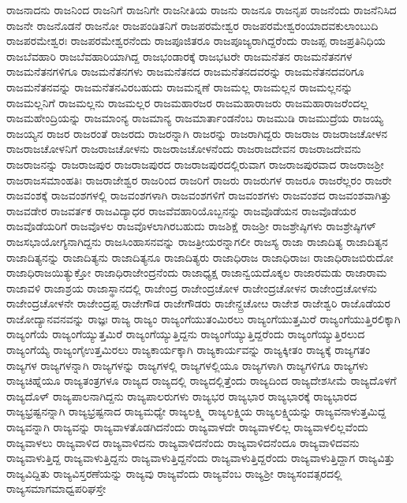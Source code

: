 {ರಾಜನಾದನು
ರಾಜನಿಂದ
ರಾಜನಿಗೆ
ರಾಜನಿಗೇ
ರಾಜನೀತಿಯ
ರಾಜನು
ರಾಜನೂ
ರಾಜನೃಪ
ರಾಜನೆಂದು
ರಾಜನೆನಿಸಿದ
ರಾಜನೇ
ರಾಜನೊಡನೆ
ರಾಜನೋ
ರಾಜಪಂಡಿತನಿಗೆ
ರಾಜಪರಮೇಶ್ವರ
ರಾಜಪರಮೇಶ್ವರಂಯಾದವಕುಲಾಂಬುದಿ
ರಾಜಪರಮೇಶ್ವರಃ
ರಾಜಪರಮೇಶ್ವರನೆಂದು
ರಾಜಪೂಜಿತರೂ
ರಾಜಪೂಜ್ಯರಾಗಿದ್ದರೆಂದು
ರಾಜಪ್ಪ
ರಾಜಪ್ರತಿನಿಧಿಯ
ರಾಜಬೆವಹಾರಿ
ರಾಜಬೆವಹಾರಿಯಾಗಿದ್ದ
ರಾಜಭಂಡಾರಕ್ಕೆ
ರಾಜಭಟರೇ
ರಾಜಮನೆತನ
ರಾಜಮನೆತನಗಳ
ರಾಜಮನೆತನಗಳಿಗೂ
ರಾಜಮನೆತನಗಳು
ರಾಜಮನೆತನದ
ರಾಜಮನೆತನದವರನ್ನು
ರಾಜಮನೆತನದವರಿಗೂ
ರಾಜಮನೆತನವನ್ನು
ರಾಜಮನೆತನವಿರಬಹುದು
ರಾಜಮನ್ನಣೆ
ರಾಜಮಲ್ಲ
ರಾಜಮಲ್ಲನ
ರಾಜಮಲ್ಲನನ್ನು
ರಾಜಮಲ್ಲನಿಗೆ
ರಾಜಮಲ್ಲನು
ರಾಜಮಲ್ಲರ
ರಾಜಮಹಾರಜರ
ರಾಜಮಹಾರಾಜರು
ರಾಜಮಹಾರಾಜರೆಂದಲ್ಲ
ರಾಜಮಹೇಂದ್ರಿಯನ್ನು
ರಾಜಮಾಂನ್ಯ
ರಾಜಮಾನ್ಯ
ರಾಜಮಾರ್ತಾಂಡನೆಂಬ
ರಾಜಮುಡಿ
ರಾಜಮುದ್ರೆಯ
ರಾಜಯ್ಯ
ರಾಜಯ್ಯನ
ರಾಜರ
ರಾಜರಂತೆ
ರಾಜರದು
ರಾಜರನ್ನಾಗಿ
ರಾಜರನ್ನು
ರಾಜರಾಗಿದ್ದರು
ರಾಜರಾಜ
ರಾಜರಾಜಚೋಳನ
ರಾಜರಾಜಚೋಳನಿಗೆ
ರಾಜರಾಜಚೋಳನು
ರಾಜರಾಜಚೋಳನೆಂದು
ರಾಜರಾಜದೇವನ
ರಾಜರಾಜದೇವನು
ರಾಜರಾಜನನ್ನು
ರಾಜರಾಜಪುರ
ರಾಜರಾಜಪುರದ
ರಾಜರಾಜಪುರದಲ್ಲಿರುವಾಗ
ರಾಜರಾಜಪುರವಾದ
ರಾಜರಾಜಶ್ರೀ
ರಾಜರಾಜಸಮಾಂಹತಿಃ
ರಾಜರಾಜೇಶ್ವರ
ರಾಜರಿಂದ
ರಾಜರಿಗೆ
ರಾಜರು
ರಾಜರುಗಳ
ರಾಜರೂ
ರಾಜರೆಲ್ಲರಂ
ರಾಜರೇ
ರಾಜವಂಶಕ್ಕೆ
ರಾಜವಂಶಗಳಲ್ಲಿ
ರಾಜವಂಶಗಳಾಗಿ
ರಾಜವಂಶಗಳಿಗೆ
ರಾಜವಂಶಗಳು
ರಾಜವಂಶದ
ರಾಜವಂಶವಾಗಿತ್ತು
ರಾಜವಡೇರ
ರಾಜವರ್ತಕ
ರಾಜವಿದ್ಯಾಧರ
ರಾಜವೆವಹಾರಿಯೊಬ್ಬನನ್ನು
ರಾಜವೊಡೆಯನ
ರಾಜವೊಡೆಯರ
ರಾಜವೊಡೆಯರಿಗೆ
ರಾಜವೊಳಲ
ರಾಜವೊಳಲಾಗಿರಬಹುದು
ರಾಜಶಿಕ್ಷೆ
ರಾಜಶ್ರೀ
ರಾಜಶ್ರೇಷ್ಠಿಗಳು
ರಾಜಶ್ರೇಷ್ಠಿಗಳ್
ರಾಜಸಭಾಯೋಗ್ಯನಾಗಿದ್ದನು
ರಾಜಸಿಂಹಾಸನವನ್ನು
ರಾಜತ್ರೀಯರನ್ನಾಗಲೀ
ರಾಜಸ್ಯ
ರಾಜಾ
ರಾಜಾದಿತ್ಯ
ರಾಜಾದಿತ್ಯನ
ರಾಜಾದಿತ್ಯನನ್ನು
ರಾಜಾದಿತ್ಯನು
ರಾಜಾದಿತ್ಯನೂ
ರಾಜಾದಿತ್ಯರು
ರಾಜಾಧಿರಾಜ
ರಾಜಾಧಿರಾಜಃ
ರಾಜಾಧಿರಾಜಬಿರುದೋ
ರಾಜಾಧಿರಾಜಯಿತ್ಯುಕ್ತೋ
ರಾಜಾಧಿರಾಜೇಂದ್ರನೆಂದು
ರಾಜಾಧ್ಯಕ್ಷ
ರಾಜಾನ್ವಯದೊಕ್ಕಲ
ರಾಜಾರಮಡು
ರಾಜಾರಾಮ
ರಾಜಾವಳಿ
ರಾಜಾಶ್ರಯ
ರಾಜಾಸ್ಥಾನದಲ್ಲಿ
ರಾಜೇಂದ್ರ
ರಾಜೇಂದ್ರಚೋಳ
ರಾಜೇಂದ್ರಚೋಳನ
ರಾಜೇಂದ್ರಚೋಳನು
ರಾಜೇಂದ್ರಚೋಳನೇ
ರಾಜೇಂದ್ರಪ್ಪ
ರಾಜೇಗೌಡ
ರಾಜೇಗೌಡರು
ರಾಜೇನ್ದ್ರಚೋೞ
ರಾಜೇಶ
ರಾಜೇಶ್ವರಿ
ರಾಜೊಡೆಯರ
ರಾಜೋದ್ಯಾನವನವನ್ನು
ರಾಜ್ಞಃ
ರಾಜ್ಯ
ರಾಜ್ಯಂ
ರಾಜ್ಯಂಗೆಯುತಂಮಿರಲು
ರಾಜ್ಯಂಗೆಯುತ್ತಮಿರೆ
ರಾಜ್ಯಂಗೆಯುತ್ತಿರಲಿಕ್ಕಾಗಿ
ರಾಜ್ಯಂಗೆಯೆ
ರಾಜ್ಯಂಗೆಯ್ಯುತ್ತಮಿರೆ
ರಾಜ್ಯಂಗೆಯ್ಯುತ್ತಿದ್ದನು
ರಾಜ್ಯಂಗೆಯ್ಯುತ್ತಿದ್ದರೆಂದು
ರಾಜ್ಯಂಗೆಯ್ಯುತ್ತಿರಲುದ
ರಾಜ್ಯಂಗೆಯ್ಯೆ
ರಾಜ್ಯಂಗೈಉತ್ತಮಿರಲು
ರಾಜ್ಯಕಾರ್ಯಕ್ಕಾಗಿ
ರಾಜ್ಯಕಾರ್ಯವನ್ನು
ರಾಜ್ಯಕ್ಕೀತಂ
ರಾಜ್ಯಕ್ಕೆ
ರಾಜ್ಯಗತಂ
ರಾಜ್ಯಗಳ
ರಾಜ್ಯಗಳನ್ನಾಗಿ
ರಾಜ್ಯಗಳನ್ನು
ರಾಜ್ಯಗಳಲ್ಲಿ
ರಾಜ್ಯಗಳಲ್ಲಿಯೂ
ರಾಜ್ಯಗಳಾಗಿ
ರಾಜ್ಯಗಳಿಗೂ
ರಾಜ್ಯಗಳು
ರಾಜ್ಯಚಿಹ್ನೆಯೂ
ರಾಜ್ಯತಂತ್ರಗಳೂ
ರಾಜ್ಯದ
ರಾಜ್ಯದಲ್ಲಿ
ರಾಜ್ಯದಲ್ಲಿತ್ತೆಂದು
ರಾಜ್ಯದಿಂದ
ರಾಜ್ಯದೇಶಸೀಮೆ
ರಾಜ್ಯದೊಳಗೆ
ರಾಜ್ಯದೊಳ್
ರಾಜ್ಯಪಾಲನಾಗಿದ್ದನು
ರಾಜ್ಯಪಾಲರುಗಳು
ರಾಜ್ಯಭರ
ರಾಜ್ಯಭಾರ
ರಾಜ್ಯಭಾರಕ್ಕೆ
ರಾಜ್ಯಭಾರದ
ರಾಜ್ಯಭ್ರಷ್ಟನನ್ನಾಗಿ
ರಾಜ್ಯಭ್ರಷ್ಟನಾದ
ರಾಜ್ಯಮಧ್ಯೇ
ರಾಜ್ಯಲಕ್ಷ್ಮಿ
ರಾಜ್ಯಲಕ್ಷ್ಮಿಯ
ರಾಜ್ಯಲಕ್ಷ್ಮಿಯನ್ನು
ರಾಜ್ಯವನಾಳುತ್ತಮಿದ್ದ
ರಾಜ್ಯವನ್ನಾಗಿ
ರಾಜ್ಯವನ್ನು
ರಾಜ್ಯವಾಳತೊಡಗಿದನೆಂದು
ರಾಜ್ಯವಾಳದೇ
ರಾಜ್ಯವಾಳಲಿಲ್ಲ
ರಾಜ್ಯವಾಳಲಿಲ್ಲವೆಂದು
ರಾಜ್ಯವಾಳಲು
ರಾಜ್ಯವಾಳಿದ
ರಾಜ್ಯವಾಳಿದನು
ರಾಜ್ಯವಾಳಿದನೆಂದು
ರಾಜ್ಯವಾಳಿದನೆಂದೂ
ರಾಜ್ಯವಾಳಿದವನು
ರಾಜ್ಯವಾಳುತ್ತಿದ್ದ
ರಾಜ್ಯವಾಳುತ್ತಿದ್ದನು
ರಾಜ್ಯವಾಳುತ್ತಿದ್ದನೆಂದು
ರಾಜ್ಯವಾಳುತ್ತಿದ್ದರೆಂದು
ರಾಜ್ಯವಾಳುತ್ತಿದ್ದಾಗ
ರಾಜ್ಯವಿತ್ತು
ರಾಜ್ಯವಿದ್ದಿತು
ರಾಜ್ಯವಿಸ್ತರಣೆಯನ್ನು
ರಾಜ್ಯವು
ರಾಜ್ಯವೆಂದು
ರಾಜ್ಯವೆಂಬ
ರಾಜ್ಯಶ್ರೀ
ರಾಜ್ಯಸಂವತ್ಸರದಲ್ಲಿ
ರಾಜ್ಯಸಮಾಗಮಾಧ್ವಪರಿಘಸ್ತೇ
}
